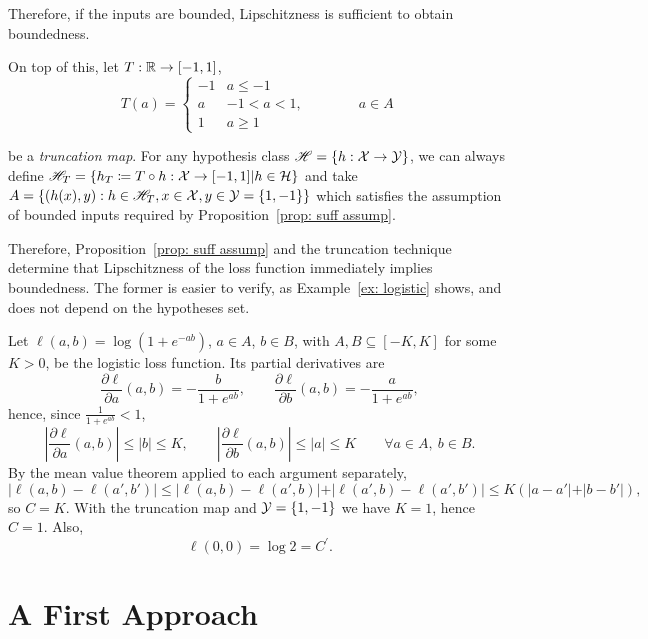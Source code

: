 \documentclass[reqno]{amsart}
\let\oldsection\section
\renewcommand{\section}{\clearpage\thispagestyle{plain}\oldsection}
\begin{document}
Therefore, if the inputs are bounded, Lipschitzness is sufficient to obtain boundedness.

On top of this,
let $T:\mathbb{R}\to[-1,1]$,
\begin{equation}
    T(a) = \begin{cases}
        -1 & a \le -1\\
        a & -1<a<1, \qquad\qquad a\in A\\
        1 & a\ge 1
    \end{cases}
\end{equation}

be a {\it truncation map\/}. 
For any hypothesis class $\mathscr{H} = \{h:\mathcal{X}\to\mathcal{Y}\}$, we can always define $\mathscr{H}_T=\{ h_T\coloneq T\circ h : \mathcal{X}\to[-1,1] \vert h\in\mathcal{H}\}$ and take $A = \{(h(x),y) : h\in\mathscr{H}_T, x\in\mathcal{X}, y\in\mathcal{Y} = \{1,-1\}\}$ which satisfies the assumption of bounded inputs required by Proposition~\ref{prop: suff assump}. 

Therefore, Proposition~\ref{prop: suff assump} and the truncation technique determine that Lipschitzness of the loss function immediately implies boundedness. The former is easier to verify, as Example~\ref{ex: logistic} shows, and does not depend on the hypotheses set.  

\begin{example}\label{ex: logistic}
    Let $\ell (a, b) = \log (1+e^{-ab})$, $a\in A$, $b\in B$, with $A,B\subseteq[-K,K]$ for some $K>0$, be the logistic loss function.
    Its partial derivatives are
    \[
    \frac{\partial \ell}{\partial a}(a,b) = -\frac{b}{1+e^{ab}}, \qquad \frac{\partial \ell}{\partial b}(a,b) = -\frac{a}{1+e^{ab}},
    \]
    hence, since $\frac{1}{1+e^{ab}}<1$,
    \[
    \left\vert \frac{\partial \ell}{\partial a}(a,b)\right\vert \le \vert b\vert \le K, \qquad \left\vert \frac{\partial \ell}{\partial b}(a,b)\right\vert \le \vert a\vert \le K \qquad \forall a\in A,\ b\in B.
    \]
    By the mean value theorem applied to each argument separately,
    \[
    \vert \ell(a,b)-\ell(a',b')\vert \le \vert \ell(a,b)-\ell(a',b)\vert + \vert \ell(a',b)-\ell(a',b')\vert \le K\left(\vert a-a'\vert + \vert b-b'\vert\right),
    \]
    so $C = K$. With the truncation map and $\mathcal{Y}=\{1,-1\}$ we have $K=1$, hence $C=1$.
    Also,
    \[
    \ell(0,0) = \log 2 = C^\prime.
    \]
\end{example}

\newpage
\section{A First Approach}\label{sec: unionbound}
\end{document}
